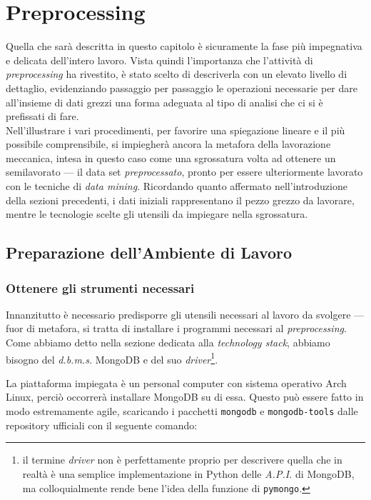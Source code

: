 \chapter{Preprocessing}

Quella che sarà descritta in questo capitolo è sicuramente la fase più impegnativa e delicata dell'intero lavoro. Vista quindi l'importanza che l'attività di \textit{preprocessing} ha rivestito, è stato scelto di descriverla con un elevato livello di dettaglio, evidenziando passaggio per passaggio le operazioni necessarie per dare all'insieme di dati grezzi una forma adeguata al tipo di analisi che ci si è prefissati di fare. \\

Nell'illustrare i vari procedimenti, per favorire una spiegazione lineare e il più possibile comprensibile, si impiegherà ancora la metafora della lavorazione meccanica, intesa in questo caso come una sgrossatura volta ad ottenere un semilavorato --- il data set \textit{preprocessato}, pronto per essere ulteriormente lavorato con le tecniche di \textit{data mining}. Ricordando quanto affermato nell'introduzione della sezioni precedenti, i dati iniziali rappresentano il pezzo grezzo da lavorare, mentre le tecnologie scelte gli utensili da impiegare nella sgrossatura.

\section{Preparazione dell'Ambiente di Lavoro}

	\subsection{Ottenere gli strumenti necessari}

		Innanzitutto è necessario predisporre gli utensili necessari al lavoro da svolgere --- fuor di metafora, si tratta di installare i programmi necessari al \textit{preprocessing}. Come abbiamo detto nella sezione dedicata alla \textit{technology stack}, abbiamo bisogno del \textit{d.b.m.s.} MongoDB e del suo \textit{driver}\footnote{il termine \textit{driver} non è perfettamente proprio per descrivere quella che in realtà è una semplice implementazione in Python delle \textit{A.P.I.} di MongoDB, ma colloquialmente rende bene l'idea della funzione di \texttt{pymongo}.}.

		La piattaforma impiegata è un personal computer con sistema operativo Arch Linux, perciò occorrerà installare MongoDB su di essa. Questo può essere fatto in modo estremamente agile, scaricando i pacchetti \texttt{mongodb} e \texttt{mongodb-tools} dalle repository ufficiali con il seguente comando:

